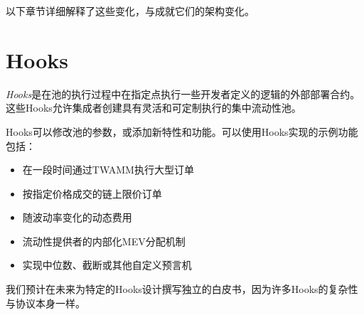\documentclass[sigconf,nonacm,prologue,table]{acmart}
\numberwithin{equation}{section}
\theoremstyle{definition}
\theoremstyle{remark}
\begin{document}
以下章节详细解释了这些变化，与成就它们的架构变化。

\section{Hooks} 
\label{sec:Hooks}

\emph{Hooks}是在池的执行过程中在指定点执行一些开发者定义的逻辑的外部部署合约。这些Hooks允许集成者创建具有灵活和可定制执行的集中流动性池。

Hooks可以修改池的参数，或添加新特性和功能。可以使用Hooks实现的示例功能包括：
\begin{itemize}
\item 在一段时间通过TWAMM执行大型订单
\item 按指定价格成交的链上限价订单
\item 随波动率变化的动态费用
\item 流动性提供者的内部化MEV分配机制
\item 实现中位数、截断或其他自定义预言机
\end{itemize}

我们预计在未来为特定的Hooks设计撰写独立的白皮书，因为许多Hooks的复杂性与协议本身一样。
\end{document}
